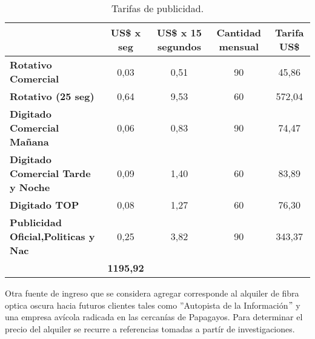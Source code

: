 \begin{itemize}
\begin{table}[H]
  \tiny
  \centering
    \begin{tabular}{|cccc|c|}
    \hline
    \rowcolor[rgb]{ .773,  .851,  .945} \multicolumn{1}{|c|}{\textbf{Publicidad}} & \multicolumn{1}{c|}{\textbf{US\$ x seg}} & \multicolumn{1}{c|}{\textbf{US\$ x 15 segundos}} & \textbf{Cantidad mensual} & \textbf{Tarifa US\$} \bigstrut\\
    \hline
    \multicolumn{1}{|l|}{\textbf{Rotativo Comercial}} & \multicolumn{1}{c|}{0,03} & \multicolumn{1}{c|}{0,51} & 90    & 45,86 \bigstrut\\
    \hline
    \multicolumn{1}{|l|}{\textbf{Rotativo (25 seg)}} & \multicolumn{1}{c|}{0,64} & \multicolumn{1}{c|}{9,53} & 60    & 572,04 \bigstrut\\
    \hline
    \multicolumn{1}{|l|}{\textbf{Digitado Comercial Mañana}} & \multicolumn{1}{c|}{0,06} & \multicolumn{1}{c|}{0,83} & 90    & 74,47 \bigstrut\\
    \hline
    \multicolumn{1}{|l|}{\textbf{Digitado Comercial Tarde y Noche}} & \multicolumn{1}{c|}{0,09} & \multicolumn{1}{c|}{1,40} & 60    & 83,89 \bigstrut\\
    \hline
    \multicolumn{1}{|l|}{\textbf{Digitado TOP}} & \multicolumn{1}{c|}{0,08} & \multicolumn{1}{c|}{1,27} & 60    & 76,30 \bigstrut\\
    \hline
    \multicolumn{1}{|l|}{\textbf{Publicidad Oficial,Politicas y Nac}} & \multicolumn{1}{c|}{0,25} & \multicolumn{1}{c|}{3,82} & 90    & 343,37 \bigstrut\\
    \hline
    \rowcolor[rgb]{ .773,  .851,  .945} \multicolumn{4}{|c|}{\textbf{Total mensual}} & \textbf{1195,92} \bigstrut\\
    \hline
    \end{tabular}%
	\caption{Tarifas de publicidad.}
  \label{tab:tarifas-publicidad}%
\end{table}%



\end{itemize}


Otra fuente de ingreso que se considera agregar corresponde al alquiler de fibra optica oscura hacia futuros clientes tales como ''Autopista de la Información$"$
y una empresa avícola radicada en las cercanías de Papagayos. Para determinar el precio del alquiler se recurre a referencias tomadas a partír de investigaciones.

